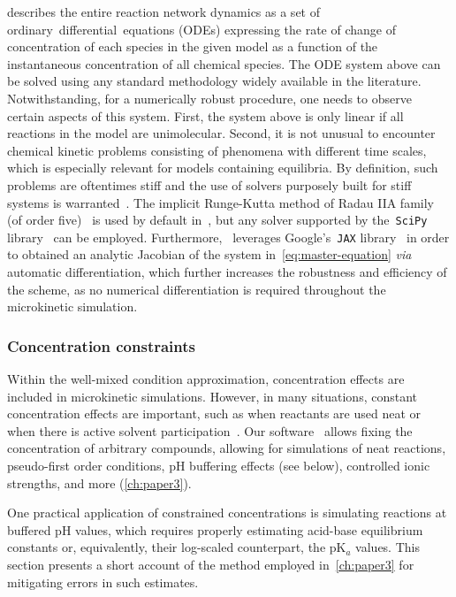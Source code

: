  describes the entire reaction network dynamics
as a set of ordinary~differential~equations (ODEs) expressing the rate of change of concentration of each species in the given model
as a function of the instantaneous concentration of all chemical species.
The ODE system above can be solved using any standard methodology widely available in the literature.
Notwithstanding,
for a numerically robust procedure,
one needs to observe certain aspects of this system.
First,
the system above is only linear if all reactions in the model are unimolecular.
Second,
it is not unusual to encounter chemical kinetic problems
consisting of
phenomena with different time scales,
which is especially relevant for models containing equilibria.
By definition,
such problems are oftentimes stiff and the use of solvers purposely built  for stiff systems is warranted~\cite{Curtiss_1952,Hairer_1991,Petzold_1983}.
The implicit Runge-Kutta method of Radau IIA family (of order five)~\cite{Hairer_1996} is used by default in~\overreact{},
but any solver supported by the~\texttt{SciPy} library~\cite{Virtanen_2020} can be employed.
Furthermore, \overreact{}~leverages Google's~\texttt{JAX} library~\cite{jax2018github}
in order to
obtained an analytic Jacobian of the system in~\cref{eq:master-equation} \emph{via} automatic differentiation,
which further increases the robustness and efficiency of the scheme,
as no numerical differentiation is required throughout the microkinetic simulation.

\subsubsection{Concentration constraints}%
\label{sec:microkinetic-constraints}

Within the well-mixed condition approximation,
concentration effects are included in microkinetic simulations.
However,
in many situations,
constant concentration effects are important,
such as when reactants are used neat or when there is active solvent participation~\cite{Ryu_2018}.
Our software~\overreact{} allows fixing the concentration of arbitrary compounds,
allowing for simulations of neat reactions,
pseudo-first order conditions,
pH buffering effects (see below),
controlled ionic strengths,
and more (\cref{ch:paper3}).

%
\label{sec:pka}

One practical application of constrained concentrations is simulating reactions at buffered pH values,
which requires properly estimating acid-base equilibrium constants or,
equivalently,
their log-scaled counterpart,
the pK$_a$ values.
This section presents a short account of the method employed in~\cref{ch:paper3} for mitigating errors in such estimates.

